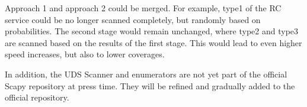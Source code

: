 Approach 1 and approach 2 could be merged. For example, type1 of the RC service could be no longer scanned completely, but randomly based on probabilities. The second stage would remain unchanged, where type2 and type3 are scanned based on the results of the first stage. This would lead to even higher speed increases, but also to lower coverages.

In addition, the UDS Scanner and enumerators are not yet part of the official Scapy repository at press time. They will be refined and gradually added to the official repository.
